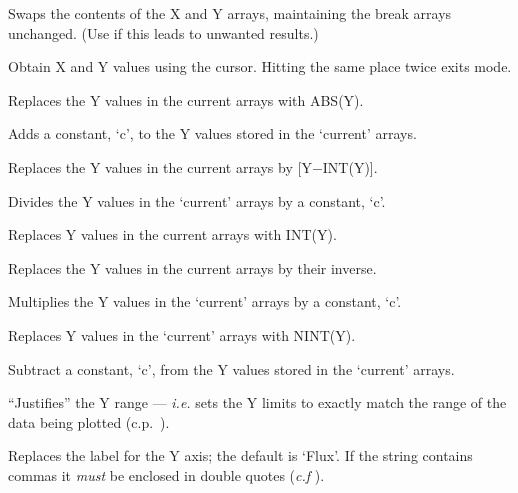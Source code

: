 \begin {description}
Swaps the contents of the X and Y arrays, maintaining the break arrays
unchanged. (Use   if this leads to unwanted results.)

Obtain X and Y values using the cursor. Hitting the same place twice
exits   mode.

Replaces the Y values in the current arrays with ABS(Y).

Adds a constant, `c', to the Y values stored in the `current' arrays.

Replaces the Y values in the current arrays by [Y$-$INT(Y)].

Divides the Y values in the `current' arrays by a constant, `c'.

Replaces Y values in the current arrays with INT(Y).

Replaces the Y values in the current arrays by their inverse.

Multiplies the Y values in the `current' arrays by a constant, `c'.

Replaces Y values in the `current' arrays with NINT(Y).

Subtract a constant, `c', from the Y values stored in the `current' arrays.

``Justifies'' the Y range --- {\em i.e.} sets the Y limits to exactly
match the range of the data being plotted (c.p.\ ). 

Replaces the label for the Y axis; the default is `Flux'. If the
string contains commas it {\em must} be enclosed in double quotes
({\it c.f} ). 


\end{description}
